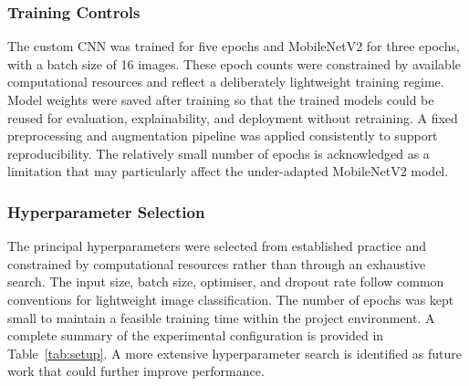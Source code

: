 \documentclass[preprint,12pt]{elsarticle}
\begin{document}
\subsubsection{Training Controls}

The custom CNN was trained for five epochs and MobileNetV2 for three epochs, with a batch size of 16 images.
These epoch counts were constrained by available computational resources and reflect a deliberately lightweight training regime.
Model weights were saved after training so that the trained models could be reused for evaluation, explainability, and deployment without retraining.
A fixed preprocessing and augmentation pipeline was applied consistently to support reproducibility.
The relatively small number of epochs is acknowledged as a limitation that may particularly affect the under-adapted MobileNetV2 model.

\subsubsection{Hyperparameter Selection}

The principal hyperparameters were selected from established practice and constrained by computational resources rather than through an exhaustive search.
The input size, batch size, optimiser, and dropout rate follow common conventions for lightweight image classification.
The number of epochs was kept small to maintain a feasible training time within the project environment.
A complete summary of the experimental configuration is provided in Table~\ref{tab:setup}.
A more extensive hyperparameter search is identified as future work that could further improve performance.
\end{document}
